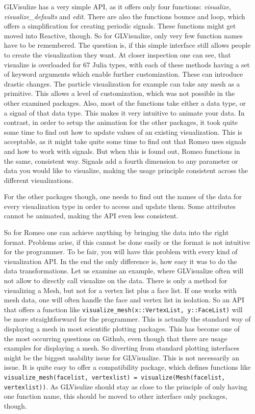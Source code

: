 GLVisulize has a very simple API, as it offers only four functions: \textit{visualize}, \textit{visualize\_defaults} and \textit{edit}.
There are also the functions bounce and loop, which offers a simplification for creating periodic signals.
These functions might get moved into Reactive, though.
So for GLVisualize, only very few function names have to be remembered.
The question is, if this simple interface still allows people to create the visualization they want.
At closer inspection one can see, that visualize is overloaded for 67 Julia types, with each of these methods having a set of keyword arguments which enable further customization.
These can introduce drastic changes. The particle visualization for example can take any mesh as a primitive. This allows a level of customization, which was not possible in the other examined packages.
Also, most of the functions take either a data type, or a signal of that data type.
This makes it very intuitive to animate your data. 
In contrast, in order to setup the animation for the other packages, it took quite some time to find out how to update values of an existing visualization. This is acceptable, as it might take quite some time to find out that Romeo uses signals and how to work with signals.
But when this is found out, Romeo functions in the same, consistent way. Signals add a fourth dimension to any parameter or data you would like to visualize, making the usage principle consistent across the different visualizations.

For the other packages though, one needs to find out the names of the data for every visualization type in order to access and update them. Some attributes cannot be animated, making the API even less consistent.

So for Romeo one can achieve anything by bringing the data into the right format.
Problems arise, if this cannot be done easily or the format is not intuitive for the programmer.
To be fair, you will have this problem with every kind of visualization API. 
In the end the only difference is, how easy it was to do the data transformations. 
Let us examine an example, where GLVisualize often will not allow to directly call visualize on the data.
There is only a method for visualizing a Mesh, but not for a vertex list plus a face list. 
If one works with mesh data, one will often handle the face and vertex list in isolation.
So an API that offers a function like \texttt{visualize\_mesh(x::VertexList, y::FaceList)} will be more straightforward for the programmer.
This is actually the standard way of displaying a mesh in most scientific plotting packages. This has become one of the most occurring questions on Github, even though that there are usage examples for displaying a mesh.
So diverting from standard plotting interfaces might be the biggest usability issue for GLVisualize.
This is not necessarily an issue. 
It is quite easy to offer a compatibility package, which defines functions like \texttt{
visualize\_mesh(facelist, vertexlist) = visualize(Mesh(facelist, vertexlist))}.
As GLVisulize should stay as close to the principle of only having one function name, this should be moved to other interface only packages, though.

